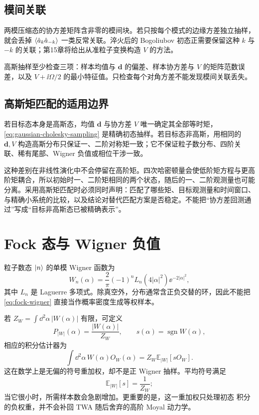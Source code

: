 \subsection{模间关联}

两模压缩态的协方差矩阵含非零的模间块。若只按每个模式的边缘方差独立抽样，就会丢掉 $\left\langle \hat a_k\hat a_{-k}\right\rangle$ 一类反常关联。淬火后的 Bogoliubov 初态正需要保留这种 $k$ 与 $-k$ 的关联；第15章将给出从准粒子变换构造 $V$ 的方法。

\begin{numericalbox}
高斯抽样至少检查三项：样本均值与 $\bm d$ 的偏差、样本协方差与 $V$ 的矩阵范数误差，以及 $V+\ii\Omega/2$ 的最小特征值。只检查每个对角方差不能发现模间关联丢失。
\end{numericalbox}

\subsection{高斯矩匹配的适用边界}

若目标态本身是高斯态，均值 $\bm d$ 与协方差 $V$ 唯一确定其全部等时矩，\cref{eq:gaussian-cholesky-sampling} 是精确初态抽样。若目标态非高斯，用相同的 $\bm d,V$ 构造高斯分布只保证一、二阶对称矩一致；它不保证粒子数分布、四阶关联、稀有尾部、Wigner 负值或相位干涉一致。

这种差别在非线性演化中不会停留在高阶矩。四次哈密顿量会使低阶矩方程与更高阶矩耦合，所以初始时一、二阶矩相同的两个状态，随后的一、二阶观测量也可能分离。采用高斯矩匹配时必须同时声明：匹配了哪些矩、目标观测量和时间窗口、与精确小系统的比较，以及结论对替代匹配方案是否稳定。不能把“协方差回测通过”写成“目标非高斯态已被精确表示”。

\section{Fock 态与 Wigner 负值}

粒子数态 $\left\lvert n\right\rangle$ 的单模 Wigner 函数为
\begin{equation}
  W_n(\alpha)=\frac{2}{\pi}(-1)^n
  L_n(4|\alpha|^2)\ee^{-2|\alpha|^2},
  \label{eq:fock-wigner}
\end{equation}
其中 $L_n$ 是 Laguerre 多项式。除真空外，分布通常含正负交替的环，因此不能把\cref{eq:fock-wigner} 直接当作概率密度生成等权样本。

若 $Z_W=\int\dd^2\alpha\,|W(\alpha)|$ 有限，可定义
\begin{equation}
  P_{|W|}(\alpha)=\frac{|W(\alpha)|}{Z_W},
  \qquad s(\alpha)=\operatorname{sgn}W(\alpha),
\end{equation}
相应的积分估计器为
\begin{equation}
  \int\dd^2\alpha\,W(\alpha)O_W(\alpha)
  =Z_W\mathbb{E}_{|W|}[sO_W].
\end{equation}
这在数学上是无偏的符号重加权，却不是正 Wigner 抽样。平均符号满足
\begin{equation}
  \mathbb{E}_{|W|}[s]=\frac{1}{Z_W};
\end{equation}
当它很小时，所需样本数会急剧增加。更重要的是，这一重加权只处理初态
积分的负权重，并不会补回 TWA 随后舍弃的高阶 Moyal 动力学。

